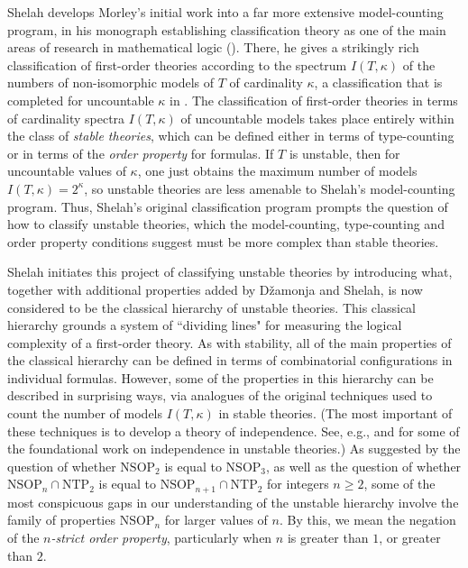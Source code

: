 \documentclass{amsart}
\theoremstyle{definition}
\theoremstyle{remark}
\numberwithin{equation}{section}
\begin{document}
\: Shelah develops Morley's initial work into a far more extensive model-counting program, in his monograph establishing classification theory as one of the main areas of research in mathematical logic (\cite{Sh90}). There, he gives a strikingly rich classification of first-order theories according to the spectrum $I(T, \kappa)$ of the numbers of non-isomorphic models of $T$ of cardinality $\kappa$, a classification that is completed for uncountable $\kappa$ in \cite{HHL00}. The classification of first-order theories in terms of cardinality spectra $I(T, \kappa)$ of uncountable models takes place entirely within the class of \textit{stable theories}, which can be defined either in terms of type-counting or in terms of the \textit{order property} for formulas. If $T$ is unstable, then for uncountable values of $\kappa$, one just obtains the maximum number of models $I(T, \kappa)=2^{\kappa}$, so unstable theories are less amenable to Shelah's model-counting program. Thus, Shelah's original classification program prompts the question of how to classify unstable theories, which the model-counting, type-counting and order property conditions suggest must be more complex than stable theories.

Shelah initiates this project of classifying unstable theories by introducing what, together with additional properties added by Džamonja and Shelah, is now considered to be the classical hierarchy of unstable theories.  This classical hierarchy grounds a system of ``dividing lines" for measuring the logical complexity of a first-order theory. As with stability, all of the main properties of the classical hierarchy can be defined in terms of combinatorial configurations in individual formulas. However, some of the properties in this hierarchy can be described in surprising ways, via analogues of the original techniques used to count the number of models $I(T, \kappa)$ in stable theories. (The most important of these techniques is to develop a theory of independence. See, e.g., \cite{Kim98} and \cite{KR17} for some of the foundational work on independence in unstable theories.) As suggested by the question of whether $\mathrm{NSOP}_{2}$ is equal to $\mathrm{NSOP}_{3}$, as well as the question of whether $\mathrm{NSOP}_{n} \cap \mathrm{NTP}_{2}$ is equal to $\mathrm{NSOP}_{n+1} \cap \mathrm{NTP}_{2}$ for integers $n \geq 2$, some of the most conspicuous gaps in our understanding of the unstable hierarchy involve the family of properties $\mathrm{NSOP}_{n}$ for larger values of $n$. By this, we mean the negation of the \textit{$n$-strict order property}, particularly when $n$ is greater than $1$, or greater than $2$.
\end{document}
